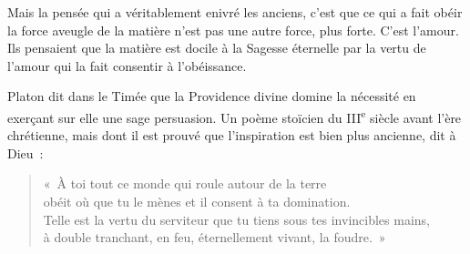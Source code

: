\documentclass[french,twoside]{book} %
\begin{document}
Mais la pensée qui a véritablement enivré les anciens, c'est que ce qui a fait obéir la force aveugle de la matière n'est pas une autre force, plus forte. C'est l'amour. Ils pensaient que la matière est docile à la Sagesse éternelle par la vertu de l'amour qui la fait consentir à l'obéissance.\par
Platon dit dans le Timée que la Providence divine domine la nécessité en exerçant sur elle une sage persuasion. Un poème stoïcien du III\textsuperscript{e} siècle avant l'ère chrétienne, mais dont il est prouvé que l'inspiration est bien plus ancienne, dit à Dieu :\par


\begin{verse}
« À toi tout ce monde qui roule autour de la terre\\
obéit où que tu le mènes et il consent à ta domination.\\
Telle est la vertu du serviteur que tu tiens sous tes invincibles mains,\\
à double tranchant, en feu, éternellement vivant, la foudre. »\\
\end{verse}
\end{document}
